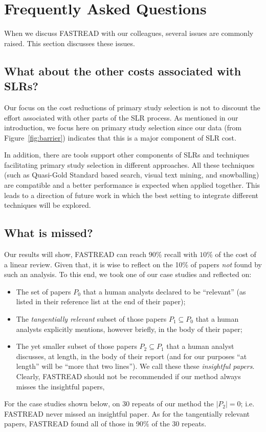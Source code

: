 \documentclass[final,twocolumn,5p]{elsarticle}
\theoremstyle{break}
\begin{document}
\section{Frequently Asked Questions}
\label{sect: Frequently Asked Questions}

When we discuss FASTREAD with our colleagues, several issues are commonly raised. This section discusses these issues.

\subsection{What about the other costs associated with SLRs?}

Our focus on the cost reductions of primary study selection is not to discount the effort associated with other parts of the SLR process. As mentioned in our introduction, we focus here on primary study selection since our data (from Figure~\ref{fig:barrier}) indicates that this is a major component of SLR cost. 

In addition, there are tools support other components of SLRs and techniques facilitating primary study selection in different approaches. All these techniques (such as  Quasi-Gold Standard based search, visual text mining, and snowballing) are compatible and a better performance is expected when applied together. This leads to a direction of future work in which the best setting to integrate different techniques will be explored.

\subsection{What is missed?}

Our results will show, FASTREAD can reach $90\%$ recall with $10\%$ of the cost of a linear review. Given that, it is wise to reflect
on the 10\% of papers {\em not} found by such an analysis. To this end, we took one of our case studies and reflected on:
\begin{itemize}
\item The set of papers $P_0$ that a human analysts declared to be ``relevant'' (as listed in their reference list at the end of their paper);
\item The {\em tangentially relevant} subset of those  papers $P_1 \subseteq P_0$ that a human analysts explicitly mentions, however briefly, in the body of their paper;
\item The yet smaller subset of those papers $P_2 \subseteq P_1$  that a human analyst discusses, at length, in the body of their report (and for
our purposes ``at length'' will be ``more that two lines''). We call these these {\em insightful papers}. Clearly, FASTREAD should not be recommended if our method always misses the insightful papers, 
\end{itemize}
For the case studies shown below, on 30 repeats of our method the $|P_2|=0$; i.e. FASTREAD never missed an insightful paper. As for the tangentially
relevant papers, FASTREAD found all of those in 90\% of the 30 repeats. 
\end{document}
